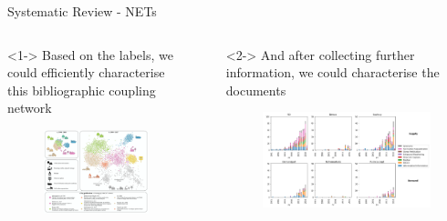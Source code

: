 \documentclass[9pt]{beamer}
\begin{document}
\begin{frame}{Systematic Review - NETs}
\begin{columns}
	\small
	\begin{column}{0.5\linewidth}<1->
		Based on the labels, we could efficiently characterise this bibliographic coupling network 
	\begin{figure}
		\includegraphics[width=\linewidth]{images/NETs_network}
		\caption{\citep{Minx2017a}}
	\end{figure}
	\end{column}
	\begin{column}{0.5\linewidth}
		\begin{itemize}
			\itemsep-1em
			\item[]<2-> And after collecting further information, we could characterise the documents
			\begin{figure}
				\includegraphics[width=0.8\linewidth]{images/nets_3}
				\caption{\citep{Nemet2017}}
			\end{figure}

\end{itemize}
\end{column}
\end{columns}
\end{frame}
\end{document}
